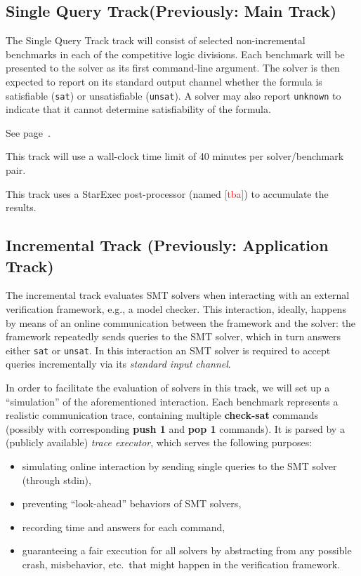 \documentclass[12pt]{article}
\newcommand{\akey}[1]{\textbf{#1}\xspace}
\newcommand{\rem}[1]{\textcolor{red}{[#1]}}
\newcommand{\maintrack}{Single Query Track\xspace}
\begin{document}
\subsection{\maintrack (Previously: Main Track)}
\label{sec:exec:single}

The \maintrack track will consist of selected non-incremental benchmarks in
each of the competitive logic divisions.  Each benchmark will be presented to
the solver as its first command-line argument.  The solver is then expected to
report on its standard output channel whether the formula is satisfiable
(\texttt{sat}) or unsatisfiable (\texttt{unsat}).  A solver may also report
\texttt{unknown} to indicate that it cannot determine satisfiability of the
formula.

 See page~\pageref{benchmark-selection}.

This track will use a wall-clock time limit of 40 minutes per solver/benchmark
pair.

This track uses a StarExec post-processor (named \rem{tba}) to accumulate the
results.

\subsection{Incremental Track (Previously: Application Track)}
\label{sec:exec:app}

The incremental track evaluates SMT solvers when interacting with an
external verification framework, e.g., a model checker. This
interaction, ideally, happens by means of an online communication
between the framework and the solver: the framework repeatedly sends
queries to the SMT solver, which in turn answers either \texttt{sat}
or \texttt{unsat}.  In this interaction an SMT solver is required to
accept queries incrementally via its \emph{standard input channel}.

In order to facilitate the evaluation of solvers in this track, we will set up
a ``simulation'' of the aforementioned interaction.  Each benchmark represents
a realistic communication trace, containing multiple \akey{check-sat} commands
(possibly with corresponding \akey{push 1} and \akey{pop 1} commands). It is
parsed by a (publicly available) \emph{trace executor},
which serves the following purposes:

\begin{itemize}
  \item simulating online interaction by sending single queries to the SMT
    solver (through stdin),
  \item preventing ``look-ahead'' behaviors of SMT solvers,
  \item recording time and answers for each command,
  \item guaranteeing a fair execution for all solvers by abstracting
  from any possible crash, misbehavior, etc.\ that might happen in the
  verification framework.
\end{itemize}
\end{document}
